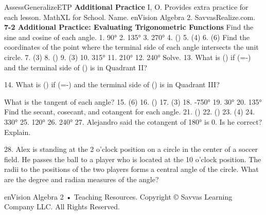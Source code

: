 \documentclass{article}
\newenvironment{te-addendum}[2]{}{}     %
\newcommand{\answer}[1]{}               %
\begin{document}
\begin{te-addendum}{Assess}{GeneralizeETP}
\textbf{Additional Practice} I, O.
Provides extra practice for each lesson. MathXL for School.
Name. enVision Algebra 2. SavvasRealize.com.
\textbf{7-2 Additional Practice: Evaluating Trigonometric Functions}
Find the sine and cosine of each angle.
1. 90° \answer{1; 0}
2. 135° \answer{(\frac{\sqrt2}{2}); (-\frac{\sqrt2}{2})}
3. 270° \answer{-1; 0}
4. (\frac{}) \answer{(\frac12); (\frac{\sqrt3}{2})}
5. (\frac{3\pi}4) \answer{(\frac{\sqrt2}{2}); (-\frac{\sqrt2}{2})}
6. (\frac{5\pi}6) \answer{(\frac12); (-\frac{\sqrt3}{2})}
Find the coordinates of the point where the terminal side of each angle intersects the unit circle.
7. (\frac{2\pi}3) \answer{(-\frac12,\frac{\sqrt3}{2})}
8. (\frac{}) \answer{(0,1)}
9. (\frac{5\pi}3) \answer{(\frac12,-\frac{\sqrt3}{2})}
10. 315° \answer{(\frac{\sqrt2}{2},-\frac{\sqrt2}{2})}
11. 210° \answer{(-\frac{\sqrt3}{2},-\frac12)}
12. 240° \answer{(-\frac12,-\frac{\sqrt3}{2})}
Solve.
13. What is (\sin\theta) if (\cos\theta=-) and the terminal side of (\theta) is in Quadrant II?
\answer{(\frac8{10})}
14. What is (\cos\theta) if (\sin\theta=-) and the terminal side of (\theta) is in Quadrant III?
\answer{(-\frac{12}{20})}
What is the tangent of each angle?
15. (\frac{11\pi}6) \answer{(-\frac{\sqrt3}{3})}
16. (\frac{}) \answer{1}
17. (\frac{5\pi}3) \answer{(-\sqrt3)}
18. -750° \answer{(-\frac{\sqrt3}{3})}
19. 30° \answer{(\frac{\sqrt3}{3})}
20. 135° \answer{-1}
Find the secant, cosecant, and cotangent for each angle.
21. (\frac{}) \answer{(\sqrt2); (\sqrt2); 1}
22. (\frac{}) \answer{(\frac{2\sqrt3}{3}); 2; (\sqrt3)}
23. (\frac{3\pi}4) \answer{(-\sqrt2); (\sqrt2); -1}
24. 330° \answer{(\frac{2\sqrt3}{3}); -2; (-\sqrt3)}
25. 120° \answer{-2; (\frac{2\sqrt3}{3}); (-\frac{\sqrt3}{3})}
26. 240° \answer{-2; (-\frac{2\sqrt3}{3}); (\frac{\sqrt3}{3})}
27. Alejandro said the cotangent of 180° is 0. Is he correct? Explain.
\answer{Alejandro is incorrect. Sample answer: The cotangent of 180° is undefined. (\cot180°=\frac{\cos180°}{\sin180°}=-\frac10).}
28. Alex is standing at the 2 o'clock position on a circle in the center of a soccer field. He passes the ball to a player who is located at the 10 o'clock position. The radii to the positions of the two players forms a central angle of the circle. What are the degree and radian measures of the angle?
\answer{120°; (\frac{2\pi}3)}
enVision Algebra 2 • Teaching Resources. Copyright © Savvas Learning Company LLC. All Rights Reserved.
\end{te-addendum}
\end{document}
